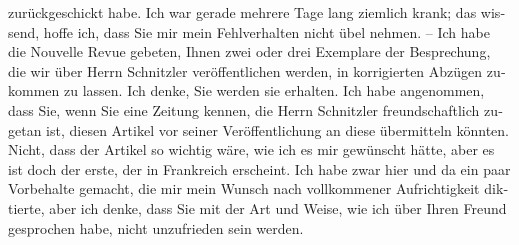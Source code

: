 \begin{otherlanguage}{french}
{{{                        zurückgeschickt habe. Ich war gerade mehrere Tage lang ziemlich krank; das
                        wissend, hoffe ich, dass Sie mir mein Fehlverhalten nicht übel nehmen. – Ich
                        habe die Nouvelle Revue gebeten, Ihnen
                        zwei oder drei Exemplare der Besprechung, die wir über Herrn Schnitzler veröffentlichen werden, in korrigierten
                        Abzügen zukommen zu lassen. Ich denke, Sie werden sie erhalten. Ich habe
                        angenommen, dass Sie, wenn Sie eine Zeitung kennen, die Herrn Schnitzler freundschaftlich zugetan ist, diesen Artikel vor seiner
                        Veröffentlichung an diese übermitteln könnten. Nicht, dass der Artikel so wichtig
                        wäre, wie ich es mir gewünscht hätte, aber es ist doch der erste, der in Frankreich erscheint. Ich habe zwar hier
                        und da ein paar Vorbehalte gemacht, die mir mein Wunsch nach vollkommener
                        Aufrichtigkeit diktierte, aber ich denke, dass Sie mit der Art und Weise,
                        wie ich über Ihren Freund gesprochen habe, nicht unzufrieden sein werden.}}}\label{K_L02777-5}\end{otherlanguage}\pend
           
